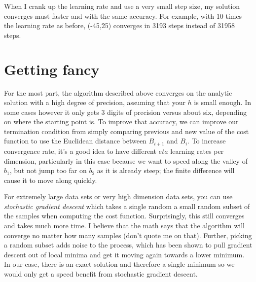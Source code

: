 \begin{fullwidth}
\noindent {}

When I crank up the learning rate and use a very small step size, my solution converges must faster and with the same accuracy. For example, with 10 times the learning rate as before, (-45,25) converges in 3193 steps instead of 31958 steps.

\section{Getting fancy}

For the most part, the algorithm described above converges on the analytic solution with a high degree of precision, assuming that your $h$ is small enough. In some cases however it only gets 3 digits of precision versus about six, depending on where the starting point is. To improve that accuracy, we can improve our termination condition from simply comparing previous and new value of the cost function to use the Euclidean distance between $B_{i+1}$ and $B_i$. To increase convergence rate, it's a good idea to have different $eta$ learning rates per dimension, particularly in this case because we want to speed along the valley of $b_1$, but not jump too far on $b_2$ as it is already steep; the finite difference will cause it to move along quickly.

For extremely large data sets or very high dimension data sets, you can use {\em stochastic gradient descent} which takes a single random a small random subset of the samples when computing the cost function. Surprisingly, this still converges and takes much more time. I believe that the math says that the algorithm will converge no matter how many samples (don't quote me on that). Further, picking a random subset adds noise to the process, which has been shown to pull gradient descent out of local minima and get it moving again towards a lower minimum. In our case, there is an exact solution and therefore a single minimum so we would only get a speed benefit from stochastic gradient descent.


\end{fullwidth}
